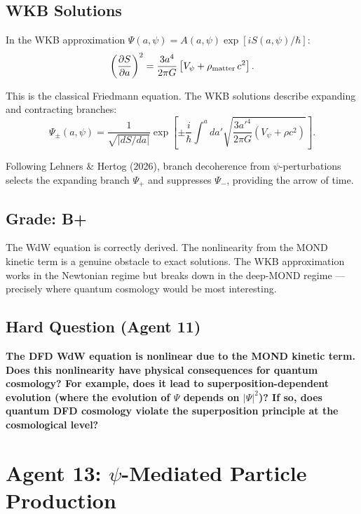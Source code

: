 \documentclass[11pt,a4paper]{article}
\begin{document}
\subsection{WKB Solutions}

In the WKB approximation $\Psi(a,\psi) = A(a,\psi)\exp[iS(a,\psi)/\hbar]$:
\begin{equation}
\left(\frac{\partial S}{\partial a}\right)^2 = \frac{3a^4}{2\pi G}\left[V_\psi + \rho_{\rm matter}\,c^2\right].
\end{equation}

This is the classical Friedmann equation. The WKB solutions describe expanding and contracting branches:
\begin{equation}
\Psi_{\pm}(a,\psi) = \frac{1}{\sqrt{|dS/da|}}\exp\left[\pm\frac{i}{\hbar}\int^a da'\sqrt{\frac{3a'^4}{2\pi G}(V_\psi + \rho c^2)}\right].
\end{equation}

Following Lehners \& Hertog (2026), branch decoherence from $\psi$-perturbations selects the expanding branch $\Psi_+$ and suppresses $\Psi_-$, providing the arrow of time.

\subsection{Grade: B+}

The WdW equation is correctly derived. The nonlinearity from the MOND kinetic term is a genuine obstacle to exact solutions. The WKB approximation works in the Newtonian regime but breaks down in the deep-MOND regime --- precisely where quantum cosmology would be most interesting.

\subsection{Hard Question (Agent 11)}

\textbf{The DFD WdW equation is nonlinear due to the MOND kinetic term. Does this nonlinearity have physical consequences for quantum cosmology? For example, does it lead to superposition-dependent evolution (where the evolution of $\Psi$ depends on $|\Psi|^2$)? If so, does quantum DFD cosmology violate the superposition principle at the cosmological level?}

\newpage

\section{Agent 13: $\psi$-Mediated Particle Production}
\label{sec:agent13}
\end{document}
